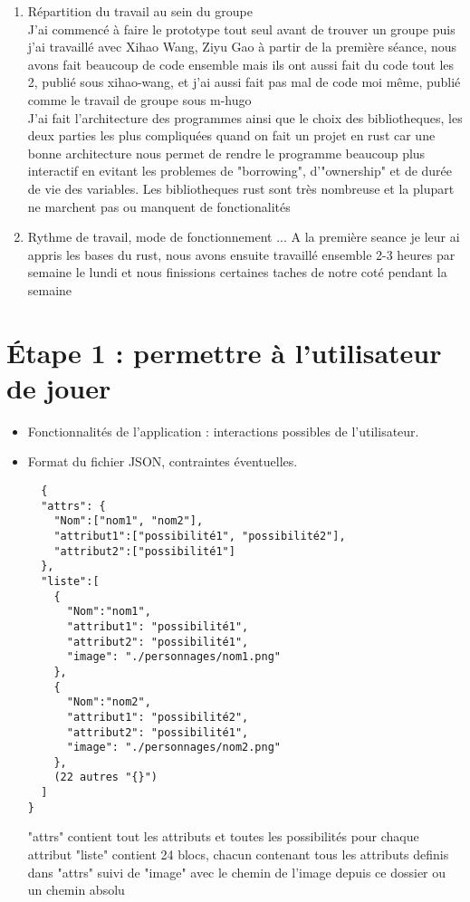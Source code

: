 \documentclass[a4paper]{article}
\begin{document}
\begin{enumerate}           %
\item
  Répartition du travail au sein du groupe\\
  J'ai commencé à faire le prototype tout seul avant de trouver un groupe puis j'ai travaillé avec Xihao Wang, Ziyu Gao à partir de la première séance, nous avons fait beaucoup de code ensemble mais ils ont aussi fait du code tout les 2, publié sous xihao-wang, et j'ai aussi fait pas mal de code moi même, publié comme le travail de groupe sous m-hugo\\
  J'ai fait l'architecture des programmes ainsi que le choix des bibliotheques, les deux parties les plus compliquées quand on fait un projet en rust car une bonne architecture nous permet de rendre le programme beaucoup plus interactif en evitant les problemes de "borrowing", d'"ownership" et de durée de vie des variables.
  Les bibliotheques rust sont très nombreuse et la plupart ne marchent pas ou manquent de fonctionalités 
\item
  Rythme de travail, mode de fonctionnement ...
  A la première seance je leur ai appris les bases du rust, nous avons ensuite travaillé ensemble 2-3 heures par semaine le lundi et nous finissions certaines taches de notre coté pendant la semaine
\end{enumerate}
\section{Étape 1 : permettre à l'utilisateur de jouer}


\begin{itemize}         
\item
  Fonctionnalités de l'application : interactions possibles de
  l'utilisateur.
\item
  Format du fichier JSON, contraintes éventuelles.\\
  \begin{verbatim}
  {
  "attrs": {
  	"Nom":["nom1", "nom2"], 
  	"attribut1":["possibilité1", "possibilité2"],
  	"attribut2":["possibilité1"]
  },
  "liste":[
    {
      "Nom":"nom1",
      "attribut1": "possibilité1",
      "attribut2": "possibilité1",
      "image": "./personnages/nom1.png"
    },
    {
      "Nom":"nom2",
      "attribut1": "possibilité2",
      "attribut2": "possibilité1",
      "image": "./personnages/nom2.png"
    },
    (22 autres "{}")
  ]
}

\end{verbatim}
 "attrs" contient tout les attributs et toutes les possibilités pour chaque attribut "liste" contient 24 blocs, chacun contenant tous les attributs definis dans "attrs" suivi de "image" avec le chemin de l'image depuis ce dossier ou un chemin absolu
\newline
\end{itemize}
\end{document}
